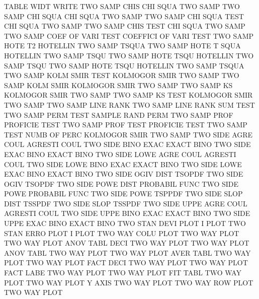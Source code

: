 TABLE    WIDT                           WRITE
TWO      SAMP CHIS                      CHI      SQUA TWO  SAMP
TWO      SAMP CHI  SQUA                 CHI      SQUA TWO  SAMP
TWO      SAMP CHI  SQUA TEST            CHI      SQUA TWO  SAMP
TWO      SAMP CHIS TEST                 CHI      SQUA TWO  SAMP
TWO      SAMP COEF OF   VARI TEST       COEFFICI OF   VARI TEST
TWO      SAMP HOTE T2                   HOTELLIN TWO  SAMP TSQUA
TWO      SAMP HOTE T    SQUA            HOTELLIN TWO  SAMP TSQU
TWO      SAMP HOTE TSQU                 HOTELLIN TWO  SAMP TSQU
TWO      SAMP HOTE TSQU                 HOTELLIN TWO  SAMP TSQUA
TWO      SAMP KOLM SMIR TEST            KOLMOGOR SMIR TWO  SAMP
TWO      SAMP KOLM SMIR                 KOLMOGOR SMIR TWO  SAMP
TWO      SAMP KS                        KOLMOGOR SMIR TWO  SAMP
TWO      SAMP KS   TEST                 KOLMOGOR SMIR TWO  SAMP
TWO      SAMP LINE RANK                 TWO      SAMP LINE RANK SUM TEST
TWO      SAMP PERM TEST                 SAMPLE   RAND PERM
TWO      SAMP PROF                      PROFICIE TEST
TWO      SAMP PROF TEST                 PROFICIE TEST
TWO      SAMP TEST NUMB OF   PERC       KOLMOGOR SMIR TWO  SAMP
TWO      SIDE AGRE COUL                 AGRESTI  COUL
TWO      SIDE BINO EXAC                 EXACT    BINO
TWO      SIDE EXAC BINO                 EXACT    BINO
TWO      SIDE LOWE AGRE COUL            AGRESTI  COUL
TWO      SIDE LOWE BINO EXAC            EXACT    BINO
TWO      SIDE LOWE EXAC BINO            EXACT    BINO
TWO      SIDE OGIV DIST                 TSOPDF
TWO      SIDE OGIV                      TSOPDF
TWO      SIDE POWE DIST                 PROBABIL FUNC
TWO      SIDE POWE                      PROBABIL FUNC
TWO      SIDE POWE                      TSPPDF
TWO      SIDE SLOP DIST                 TSSPDF
TWO      SIDE SLOP                      TSSPDF
TWO      SIDE UPPE AGRE COUL            AGRESTI  COUL
TWO      SIDE UPPE BINO EXAC            EXACT    BINO
TWO      SIDE UPPE EXAC BINO            EXACT    BINO
TWO      STAN DEVI PLOT                 I        PLOT
TWO      STAN ERRO PLOT                 I        PLOT
TWO      WAY  COLU PLOT                 TWO      WAY  PLOT
TWO      WAY  PLOT ANOV TABL DECI       TWO      WAY  PLOT
TWO      WAY  PLOT ANOV TABL            TWO      WAY  PLOT
TWO      WAY  PLOT AVER TABL            TWO      WAY  PLOT
TWO      WAY  PLOT FACT DECI            TWO      WAY  PLOT
TWO      WAY  PLOT FACT LABE            TWO      WAY  PLOT
TWO      WAY  PLOT FIT  TABL            TWO      WAY  PLOT
TWO      WAY  PLOT Y    AXIS            TWO      WAY  PLOT
TWO      WAY  ROW  PLOT                 TWO      WAY  PLOT
